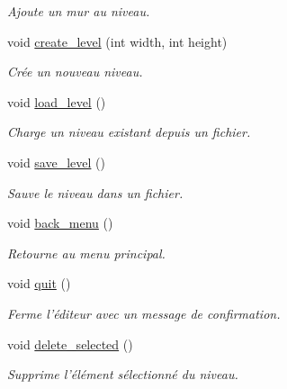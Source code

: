 \begin{DoxyCompactItemize}
\begin{DoxyCompactList}\small\item\em Ajoute un mur au niveau. \end{DoxyCompactList}\item 
void \hyperlink{classMainEditor_af81aaab8562c2af4833d2cccfaaba2cb}{create\+\_\+level} (int width, int height)
\begin{DoxyCompactList}\small\item\em Crée un nouveau niveau. \end{DoxyCompactList}\item 
\hypertarget{classMainEditor_a84fe185f03ff8984471380206607e2a1}{void \hyperlink{classMainEditor_a84fe185f03ff8984471380206607e2a1}{load\+\_\+level} ()}\label{classMainEditor_a84fe185f03ff8984471380206607e2a1}

\begin{DoxyCompactList}\small\item\em Charge un niveau existant depuis un fichier. \end{DoxyCompactList}\item 
\hypertarget{classMainEditor_a21dcf035be9044cd0e4677761f778505}{void \hyperlink{classMainEditor_a21dcf035be9044cd0e4677761f778505}{save\+\_\+level} ()}\label{classMainEditor_a21dcf035be9044cd0e4677761f778505}

\begin{DoxyCompactList}\small\item\em Sauve le niveau dans un fichier. \end{DoxyCompactList}\item 
\hypertarget{classMainEditor_a41d9558029b00e6af70b67b2ef6b2abd}{void \hyperlink{classMainEditor_a41d9558029b00e6af70b67b2ef6b2abd}{back\+\_\+menu} ()}\label{classMainEditor_a41d9558029b00e6af70b67b2ef6b2abd}

\begin{DoxyCompactList}\small\item\em Retourne au menu principal. \end{DoxyCompactList}\item 
\hypertarget{classMainEditor_a2ad5e523c18fb96ce38616145b1b050e}{void \hyperlink{classMainEditor_a2ad5e523c18fb96ce38616145b1b050e}{quit} ()}\label{classMainEditor_a2ad5e523c18fb96ce38616145b1b050e}

\begin{DoxyCompactList}\small\item\em Ferme l’éditeur avec un message de confirmation. \end{DoxyCompactList}\item 
\hypertarget{classMainEditor_a171515374a86a6bb81af0f34a4857cb3}{void \hyperlink{classMainEditor_a171515374a86a6bb81af0f34a4857cb3}{delete\+\_\+selected} ()}\label{classMainEditor_a171515374a86a6bb81af0f34a4857cb3}

\begin{DoxyCompactList}\small\item\em Supprime l’élément sélectionné du niveau. \end{DoxyCompactList}\end{DoxyCompactItemize}

